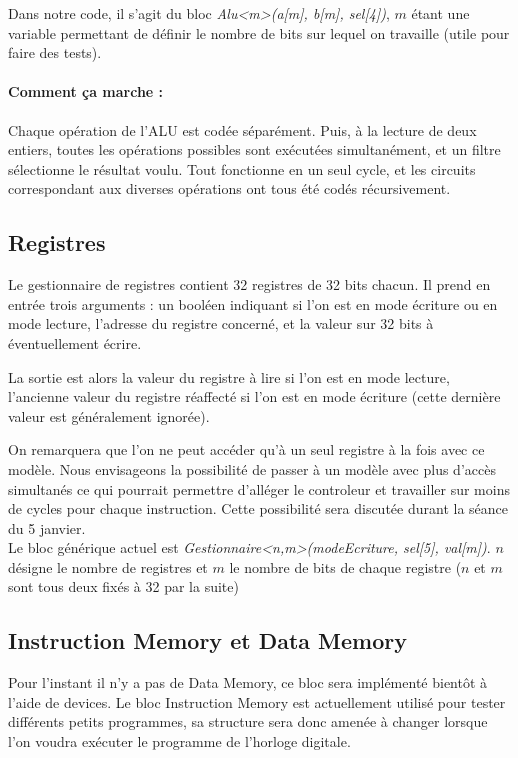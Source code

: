 \documentclass[13pt]{article}
\begin{document}
Dans notre code, il s'agit du bloc 
\textit{Alu<m>(a[m], b[m], sel[4])}, $m$ étant
une variable permettant de définir le nombre de bits
sur lequel on travaille (utile pour faire des tests).

\paragraph*{Comment ça marche :}

Chaque opération de l'ALU est codée séparément. Puis, à la lecture
de deux entiers, toutes les opérations possibles sont exécutées simultanément,
et un filtre sélectionne le résultat voulu. Tout fonctionne en un
seul cycle, et les circuits correspondant aux diverses opérations
ont tous été codés récursivement.

\subsection{Registres}

Le gestionnaire de registres contient 32 registres de 32 bits 
chacun. Il prend en entrée trois arguments : un booléen indiquant
si l'on est en mode écriture ou en mode lecture, l'adresse du registre
concerné, et la valeur sur 32 bits à éventuellement écrire. 

La sortie est alors la valeur du registre à lire si l'on est
en mode lecture, l'ancienne valeur du registre réaffecté si l'on
est en mode écriture (cette dernière valeur est généralement 
ignorée).

On remarquera
que l'on ne peut accéder qu'à un seul registre 
à la fois avec ce modèle. Nous envisageons la possibilité
de passer à un modèle avec plus d'accès simultanés
ce qui pourrait permettre d'alléger le controleur et travailler
sur moins de cycles pour chaque instruction. 
Cette possibilité sera discutée durant la séance du 5 janvier.\\
 
Le bloc générique actuel est
\textit{Gestionnaire<n,m>(modeEcriture, sel[5], val[m])}.
$n$ désigne le nombre de registres et $m$ le nombre de bits
de chaque registre
($n$ et $m$ sont tous deux fixés à 32 par la suite)

\subsection{Instruction Memory et Data Memory}

Pour l'instant il n'y a pas de Data Memory, ce bloc
sera implémenté bientôt à l'aide de devices. 
Le bloc Instruction Memory est actuellement utilisé
pour tester différents petits programmes, sa structure 
sera donc amenée à changer lorsque l'on voudra exécuter
le programme de l'horloge digitale.
\end{document}
